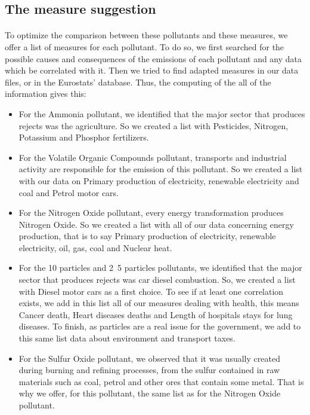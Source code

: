 \documentclass[preprint,journal]{vgtc}       %
\begin{document}
	\subsection{The measure suggestion}
	\paragraph{}
	To optimize the comparison between these pollutants and these measures, we offer a list of measures for each pollutant. To do so, we first searched for the possible causes and consequences of the emissions of each pollutant and any data which be correlated with it. Then we tried to find adapted measures in our data files, or in the Eurostats’ database.
\newline
Thus, the computing of the all of the information gives this:	
\begin{itemize}[leftmargin=*,parsep=0cm]
	\item For the Ammonia pollutant, we identified that the major sector that produces rejects was the agriculture. So we created a list with Pesticides, Nitrogen, Potassium and Phosphor fertilizers.
	\item For the Volatile Organic Compounds pollutant, transports and industrial activity are responsible for the emission of this pollutant. So we created a list with our data on Primary production of electricity, renewable electricity and coal and Petrol motor cars.
	\item For the Nitrogen Oxide pollutant, every energy transformation produces Nitrogen Oxide. So we created a list with all of our data concerning energy production, that is to say Primary production of electricity, renewable electricity, oil, gas, coal and Nuclear heat.
	\item For the \unit{10}{\micro\meter} particles and \unit{2.5}{\micro\meter} particles pollutants, we identified that the major sector that produces rejects was car diesel combustion. So, we created a list with Diesel motor cars as a first choice. To see if at least one correlation exists, we add in this list all of our measures dealing with health, this means Cancer death, Heart diseases deaths and Length of hospitals stays for lung diseases. To finish, as particles are a real issue for the government, we add to this same list data about environment and transport taxes.
	\item For the Sulfur Oxide pollutant, we observed that it was usually created during burning and refining processes, from the sulfur contained in raw materials such as coal, petrol and other ores that contain some metal. That is why we offer, for this pollutant, the same list as for the Nitrogen Oxide pollutant.
\end{itemize}
 
\end{document}
